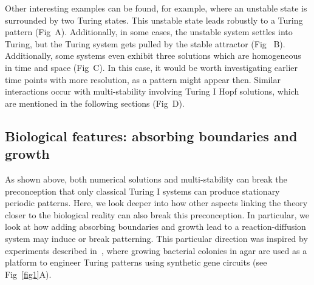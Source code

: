 \documentclass[10pt,letterpaper]{article}
\begin{document}
Other interesting examples can be found, for example, where an unstable state is surrounded by two Turing states. This unstable state leads robustly to a Turing pattern (Fig~A).
Additionally, in some cases, the unstable system settles into Turing, but the Turing system gets pulled by the stable attractor (Fig ~B). Additionally, some systems even exhibit three solutions which are homogeneous in time and space (Fig~C). In this case, it would be worth investigating earlier time points with more resolution, as a pattern might appear then.
Similar interactions occur with multi-stability involving Turing I Hopf solutions, which are mentioned in the following sections (Fig~D).




\subsection*{Biological features: absorbing boundaries and growth}
As shown above, both numerical solutions and multi-stability can break the preconception that only classical Turing I systems can produce stationary periodic patterns.
Here, we look deeper into how other aspects linking the theory closer to the biological reality can also break this preconception.
In particular, we look at how adding absorbing boundaries and growth lead to a reaction-diffusion system may induce or break patterning.
This particular direction was inspired by experiments described in~\parencite{Oliver2023}, where growing bacterial colonies in agar are used as a platform to engineer Turing patterns using synthetic gene circuits (see Fig~\ref{fig1}A).
\end{document}
